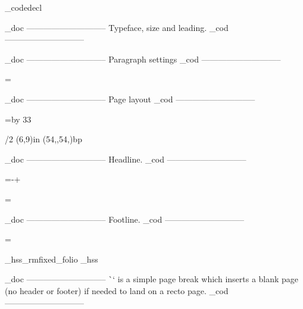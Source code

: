 \_codedecl 

    \_doc -----------------------------
    Typeface, size and leading.
    \_cod -----------------------------

\fontfam[ebgaramond]
\typosize[11/14]

\def\ChapRed{\setcmykcolor{0 1 1 0.10}}

    \_doc -----------------------------
    Paragraph settings
    \_cod -----------------------------

\parskip=0pt
\parindent=\baselineskip

\relax
{}\relax

    \_doc -----------------------------
    Page layout
    \_cod -----------------------------






\hsize=4in\relax
\vsize=\topskip \advance\vsize by 33\baselineskip\relax %

\margins/2 (6,9)in (54,,54,)bp

    \_doc -----------------------------
    Headline.
    \_cod -----------------------------

\newif\ifheadline \headlinetrue
\newif\iffootline \footlinetrue

\headlinedist=\dimexpr\baselineskip-\topskip+\baselineskip\relax

\def\_runningchap{}

\headline={%
    \ifheadline
        \ifodd\pageno
            \hss{\it \_runningchap}\hss
        \else
            \hss{\it The Man who was Thursday}\hss
        \fi
    \else
        \global\headlinetrue
    \fi    
}

    \_doc -----------------------------
    Footline.
    \_cod -----------------------------

\baselineskip

\footline={%
    \iffootline
        \ifodd\pageno
            \_hss\_rmfixed\currvar \_folio \_hss%
        \else
            \_hss\_rmfixed\setff{+onum,+pnum}\currvar \_folio \_hss%
        \fi
    \else
        \global\footlinetrue
    \fi
}

    \_doc -----------------------------
    \`\skiptorecto` is a simple page break which inserts a blank page
    (no header or footer) if needed to land on a recto page.
    \_cod -----------------------------

